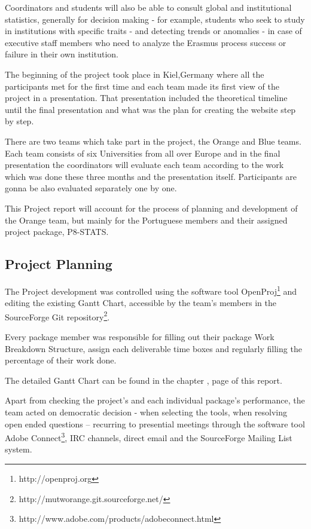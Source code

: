 Coordinators and students will also be able to consult global and institutional
statistics, generally for decision making - for example, students who seek to
study in institutions with specific traits - and detecting trends or anomalies
- in case of executive staff members who need to analyze the Erasmus process
success or failure in their own institution.

The beginning of the project took place in Kiel,Germany where all the
participants met for the first time and each team made its first view of the
project in a presentation. That presentation included the theoretical timeline
until the final presentation and what was the plan for creating the website step
by step.

There are two teams which take part in the project, the Orange and Blue
teams. Each team consists of six Universities from all over Europe and in the
final presentation the coordinators will evaluate each team according to the
work which was done these three months and the presentation itself.
Participants are gonna be also evaluated separately one by one.

This Project report will account for the process of planning and development of
the Orange team, but mainly for the Portuguese members and their assigned
project package, P8-STATS.

\subsection{Project Planning}

The Project development was controlled using the software tool
OpenProj\footnote{http://openproj.org} and editing the existing Gantt Chart,
accessible by the team's members in the SourceForge Git
repository\footnote{http://mutworange.git.sourceforge.net/}.

Every package member was responsible for filling out
their package Work Breakdown Structure, assign each deliverable time boxes and
regularly filling the percentage of their work done.


The detailed Gantt Chart can be found in the chapter \emph{}, page
\pageref{apx5} of this report.


Apart from checking the project's and each individual package's performance, the
team acted on democratic decision - when selecting the tools, when resolving
open ended questions – recurring to presential meetings through the software
tool Adobe Connect\footnote{http://www.adobe.com/products/adobeconnect.html},
IRC channels, direct email and the SourceForge Mailing List system.


